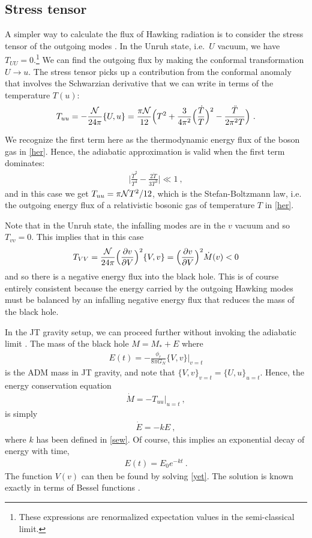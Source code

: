 \documentclass[12pt]{article}
\newcommand{\EQ}[1]{\begin{equation}\begin{split} #1
\end{split}\end{equation}}
\begin{document}
\subsection{Stress tensor}

A simpler way to calculate the flux of Hawking radiation is to consider the stress tensor of the outgoing modes \cite{BD}. In the  Unruh state, i.e.~$U$ vacuum, we have $T_{UU}=0$.\footnote{These expressions are renormalized expectation values in the semi-classical limit.} We can find the outgoing flux by making the conformal transformation $U\to u$. The stress tensor picks up a contribution from the conformal anomaly that involves the Schwarzian derivative that we can write  in terms of the temperature $T(u)$:
\EQ{
T_{uu}=-\frac{\cal N}{24\pi}\{U,u\}=\frac{\pi {\cal N}}{12}\Big(T^2+\frac3{4\pi^2}\Big(\frac{\dot T}{T}\Big)^2-\frac{\ddot T}{2\pi^2T}\Big)\ .
}

We recognize the first term here as the thermodynamic energy flux of the boson gas in \eqref{her}. Hence, the adiabatic approximation is valid when the first term dominates:
\EQ{
\Big|\frac{\dot T^2}{T^4}-\frac{2\ddot T}{3T^3}\Big|\ll1\ ,
\label{sup}
}
and in this case we get $T_{uu}=\pi{\cal N}T^2/12$, which is the Stefan-Boltzmann law, i.e. the outgoing energy flux of a relativistic bosonic gas of temperature $T$ in \eqref{her}. 

Note that in the Unruh state, the infalling modes are in the $v$ vacuum and so  $T_{vv}=0$. This implies that  in this case 
\EQ{
T_{VV}=\frac{\cal N}{24\pi}\Big(\frac{\partial v}{\partial V}\Big)^2\{V,v\}=\Big(\frac{\partial v}{\partial V}\Big)^2\dot M(v)<0
}
and so there is a negative energy flux into the black hole.  This is of course entirely consistent because the energy carried by the outgoing Hawking modes must be balanced by an infalling negative energy flux that reduces the mass of the black hole.

In the JT gravity setup, we can proceed further without invoking the adiabatic limit \cite{Almheiri:2019psf,Hollowood:2020cou}. The mass of the black hole $M=M_*+E$ where 
\EQ{
E(t)=-\frac{\phi_r}{8\pi G_N}\{V,v\}\Big|_{v=t}
\label{yet}
}
is the ADM mass in JT gravity, and note that $\{V,v\}_{v=t}=\{U,u\}_{u=t}$. Hence, the energy conservation equation
\EQ{
\dot M=-T_{uu}\Big|_{u=t}\ ,
}
is simply
\EQ{
\dot E=-kE\ ,
}
where $k$ has been defined in \eqref{sew}. Of course, this implies an exponential decay of energy with time,
\EQ{
E(t)=E_0e^{-kt}\ .
}
The function $V(v)$ can then be found by solving \eqref{yet}. The solution is known exactly in terms of Bessel functions \cite{Almheiri:2019psf,Hollowood:2020cou}.
\end{document}
